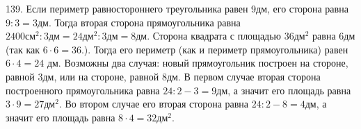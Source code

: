139. Если периметр равностороннего треугольника равен 9дм, его сторона равна $9:3=3\text{дм}.$ Тогда вторая сторона прямоугольника равна $2400\text{см}^2:3\text{дм}=24\text{дм}^2:3\text{дм}=8\text{дм}$. Сторона квадрата с площадью $36\text{дм}^2$ равна 6дм (так как $6\cdot6=36.$). Тогда его периметр (как и периметр прямоугольника) равен $6\cdot4=24$ дм. Возможны два случая: новый прямоугольник построен на стороне, равной 3дм, или на стороне, равной 8дм. В первом случае вторая сторона построенного прямоугольника равна $24:2-3=9$дм, а значит его площадь равна $3\cdot9=27\text{дм}^2.$ Во втором случае его вторая сторона равна $24:2-8=4$дм, а значит его площадь равна $8\cdot4=32\text{дм}^2.$\\
